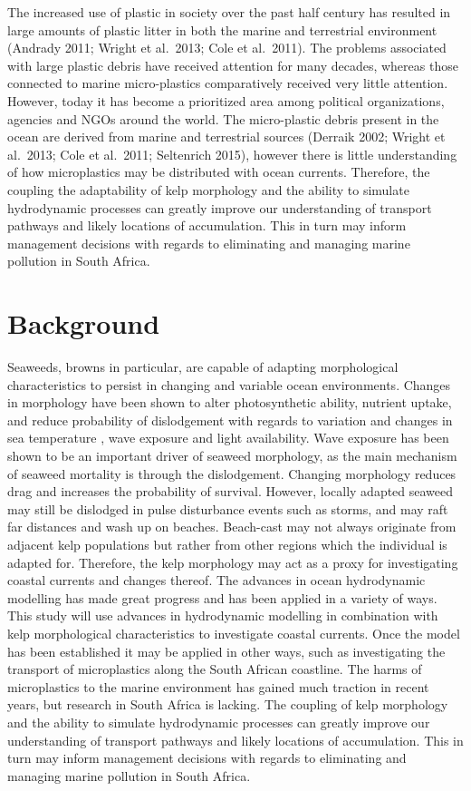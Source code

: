 \documentclass[
]{article}
\begin{document}
The increased use of plastic in society over the past half century has
resulted in large amounts of plastic litter in both the marine and
terrestrial environment (Andrady 2011; Wright et al.~2013; Cole et
al.~2011). The problems associated with large plastic debris have
received attention for many decades, whereas those connected to marine
micro-plastics comparatively received very little attention. However,
today it has become a prioritized area among political organizations,
agencies and NGOs around the world. The micro-plastic debris present in
the ocean are derived from marine and terrestrial sources (Derraik 2002;
Wright et al.~2013; Cole et al.~2011; Seltenrich 2015), however there is
little understanding of how microplastics may be distributed with ocean
currents. Therefore, the coupling the adaptability of kelp morphology
and the ability to simulate hydrodynamic processes can greatly improve
our understanding of transport pathways and likely locations of
accumulation. This in turn may inform management decisions with regards
to eliminating and managing marine pollution in South Africa.

\hypertarget{background}{%
\section{Background}\label{background}}

Seaweeds, browns in particular, are capable of adapting morphological
characteristics to persist in changing and variable ocean environments.
Changes in morphology have been shown to alter photosynthetic ability,
nutrient uptake, and reduce probability of dislodgement with regards to
variation and changes in sea temperature , wave exposure and light
availability. Wave exposure has been shown to be an important driver of
seaweed morphology, as the main mechanism of seaweed mortality is
through the dislodgement. Changing morphology reduces drag and increases
the probability of survival. However, locally adapted seaweed may still
be dislodged in pulse disturbance events such as storms, and may raft
far distances and wash up on beaches. Beach-cast may not always
originate from adjacent kelp populations but rather from other regions
which the individual is adapted for. Therefore, the kelp morphology may
act as a proxy for investigating coastal currents and changes thereof.
The advances in ocean hydrodynamic modelling has made great progress and
has been applied in a variety of ways. This study will use advances in
hydrodynamic modelling in combination with kelp morphological
characteristics to investigate coastal currents. Once the model has been
established it may be applied in other ways, such as investigating the
transport of microplastics along the South African coastline. The harms
of microplastics to the marine environment has gained much traction in
recent years, but research in South Africa is lacking. The coupling of
kelp morphology and the ability to simulate hydrodynamic processes can
greatly improve our understanding of transport pathways and likely
locations of accumulation. This in turn may inform management decisions
with regards to eliminating and managing marine pollution in South
Africa.
\end{document}
